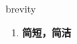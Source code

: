 
\begin{frame}
{\huge brevity}
\begin{center}
\begin{enumerate}\Large
  \item \textbf{简短，简洁}
\end{enumerate}
\end{center}
\end{frame}
